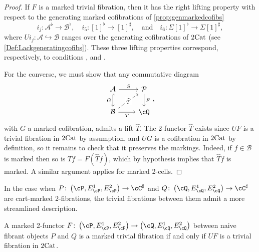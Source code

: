 \documentclass[11pt, dvipsnames]{amsart}
\begin{document}
		\begin{proof}
			If $F$ is a marked trivial fibration, then it has the right lifting property with respect to the generating marked cofibrations of \cref{prop:genmarkedcofibs}
			\[
				i_j\colon\mathcal A^\flat\to\mathcal B^\flat
				,\quad
				i_5\colon [1]^\flat\to[1]^\sharp
				,\quad\text{and}\quad
				i_6\colon \Sigma[1]^\flat\to\Sigma[1]^\sharp,
			\]
			where $Ui_j\colon \mathcal A\hookrightarrow \mathcal B$ ranges over the generating cofibrations of $2\mathrm{Cat}$ (see \cref{Def:Lackgeneratingcofibs}).
			These three lifting properties correspond, respectively, to conditions ,  and . 
            
            For the converse, we must show that any commutative diagram
			\[
			\begin{tikzcd}
			\mathcal A \arrow[r, "S"] \arrow[d, "G"', hookrightarrow]     & \mathcal P \arrow[d, "F"] \\
			\mathcal B \arrow[r, "T"'] \arrow[ru, dashed,"\widehat T" description] & \cQ            
			\end{tikzcd},
			\]
			with $G$ a marked cofibration, admits a lift $\widehat{T}$.
			The 2-functor $\widehat T$ exists since $UF$ is a trivial fibration in $2\mathrm{Cat}$ by assumption, and $UG$ is a cofibration in $2\mathrm{Cat}$ by definition, so it remains to check that it preserves the markings.
			Indeed, if $f\in\mathcal B$ is marked then so is $Tf = F(\widehat Tf)$, which by hypothesis implies that $\widehat Tf$ is marked.
			A similar argument applies for marked 2-cells.
		\end{proof}

        In the case when $P\colon \markedscat{\cP}\to\cC^\sharp$ and $Q\colon\markedscat{\cQ}\to\cC^\sharp$ are cart-marked 2-fibrations, the trivial fibrations between them admit a more streamlined description.

		\begin{prop}\label{cor:trivfibbtwfibobj}
			A marked 2-functor $F\colon\markedscat{\cP}\to \markedscat{\cQ}$ between naive fibrant objects $P$ and $Q$ is a marked trivial fibration if and only if $UF$ is a  trivial fibration in $2\mathrm{Cat}$.
		\end{prop}
\end{document}
